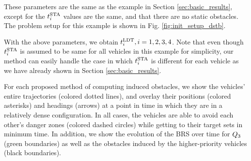 These parameters are the same as the example in Section \ref{sec:basic_results}, except for the $t^\text{STA}_i$ values are the same, and that there are no static obstacles. The problem setup for this example is shown in Fig. \ref{fig:init_setup_dstb}.

With the above parameters, we obtain $t^\text{LDT}_i, i=1,2,3,4$. Note that even though $t^\text{STA}_i$ is assumed to be same for all vehicles in this example for simplicity, our method can easily handle the case in which $t^\text{STA}_i$ is different for each vehicle as we have already shown in Section \ref{sec:basic_results}.

For each proposed method of computing induced obstacles, we show the vehicles' entire trajectories (colored dotted lines), and overlay their positions (colored asterisks) and headings (arrows) at a point in time in which they are in a relatively dense configuration. In all cases, the vehicles are able to avoid each other's danger zones (colored dashed circles) while getting to their target sets in minimum time. In addition, we show the evolution of the BRS over time for $Q_3$ (green boundaries) as well as the obstacles induced by the higher-priority vehicles (black boundaries).

